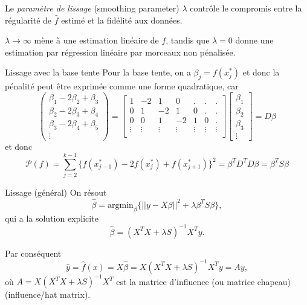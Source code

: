 \documentclass{BeamerTemplate}
\begin{document}
\begin{refsection}
\begin{frame}{}
\bigskip
Le \textit{paramètre de lissage} (smoothing parameter) $\lambda$ contrôle le compromis entre la régularité de $\hat{f}$ estimé et la fidélité aux données.

\bigskip
 $\lambda \rightarrow \infty$ mène à une estimation linéaire de $f$, tandis que $\lambda=0$ donne une estimation par régression linéaire par morceaux non pénalisée.
\end{frame}

\begin{frame}{Lissage avec la base tente}
Pour la base tente, on a $\beta_j = f(x_j^*)$ et donc la pénalité peut être exprimée comme une forme quadratique, car
$$ \left( 
\begin{array}{c}
\beta_1 - 2 \beta_2 + \beta_3 \\
\beta_2 - 2 \beta_3 + \beta_4 \\
\beta_3 - 2 \beta_4 + \beta_5 \\
\vdots
\end{array}
\right) = \left[
\begin{array}{ccccccc}
1 & -2 & 1 & 0 & . & . & . \\
0 & 1 & -2 & 1 & 0 & . & . \\
0 & 0 & 1 & -2 & 1 & 0 & . \\
\vdots & \vdots &\vdots &\vdots &\vdots &\vdots &\vdots \\
\end{array}
\right]  \left[
\begin{array}{c}
\beta_1 \\
\beta_2 \\
\beta_3 \\
\vdots
\end{array}
\right] = D \beta
$$
et donc 
$$ {\mathcal P}(f) = \sum_{j=2}^{k-1} \{f(x_{j-1}^*) - 2 f(x_j^*) + f(x_{j+1}^*) \}^2 = \beta^T D^T D \beta = \beta^T S \beta$$
\end{frame}

\begin{frame}{Lissage (général)}
On résout
 $$\hat{\beta} = \mbox{argmin}_{\beta} \{  ||y - X \beta ||^2 + \lambda  \beta^T S \beta \},$$
qui a la solution explicite
 $$\hat{\beta} = (X^T X + \lambda S)^{-1} X^T y.$$
 
\bigskip
Par conséquent 
$$ \hat{y} = \hat{f}(x) = X \hat{\beta} = X (X^T X + \lambda S)^{-1} X^T y = A y,$$
où $A= X (X^T X + \lambda S)^{-1} X^T$ est la matrice d'influence (ou matrice chapeau) (influence/hat matrix). 

\label{linear.smoother}


\end{frame}
\end{refsection}
\end{document}
